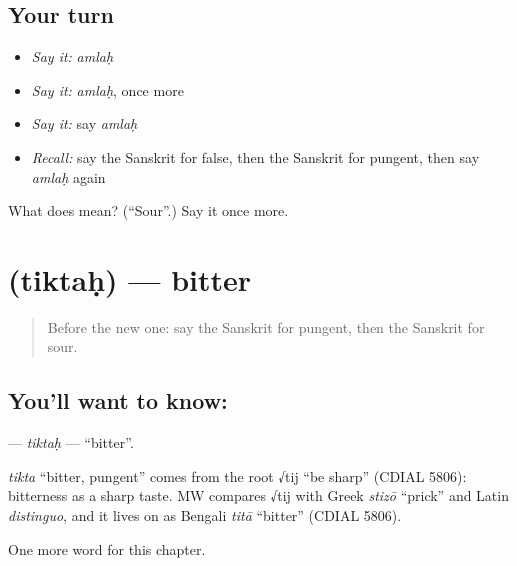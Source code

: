\subsection*{Your turn}
\begin{itemize}
\raggedright
  \item \emph{Say it:} \emph{amlaḥ}
  \item \emph{Say it:} \emph{amlaḥ}, once more
  \item \emph{Say it:} say \emph{amlaḥ}
  \item \emph{Recall:} say the Sanskrit for false, then the Sanskrit for pungent, then say \emph{amlaḥ} again
\end{itemize}

\begin{tcolorbox}[breakable,colback=teal!4,colframe=teal!35!black,title={Before you move on}]
What does  mean? (\textquotedblleft{}Sour\textquotedblright{}.) Say it once more.
\end{tcolorbox}
\section[\texorpdfstring{\sk{तिक्तः} (tiktaḥ)}{तिक्तः (tiktaḥ)}]{ (tiktaḥ) — bitter}

\label{lesson:SA-C128-tiktah}



\begin{quote}
Before the new one: say the Sanskrit for pungent, then the Sanskrit for sour.
\end{quote}

\subsection*{You'll want to know: }
\textbf{} — \emph{tiktaḥ} — \textquotedblleft{}bitter\textquotedblright{}.

\begin{cousinweb}
\emph{tikta} \textquotedblleft{}bitter, pungent\textquotedblright{} comes from the root √tij \textquotedblleft{}be sharp\textquotedblright{} (CDIAL 5806): bitterness as a sharp taste. MW compares √tij with Greek \emph{stizō} \textquotedblleft{}prick\textquotedblright{} and Latin \emph{distinguo}, and it lives on as Bengali \emph{titā} \textquotedblleft{}bitter\textquotedblright{} (CDIAL 5806).
\end{cousinweb}

\begin{grammarlens}[title={What you've built}]
One more word for this chapter.
\end{grammarlens}

